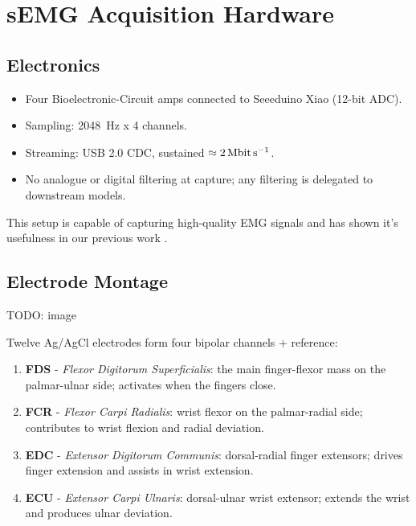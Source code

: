 \section{sEMG Acquisition Hardware}

\subsection{Electronics}
\begin{itemize}
  \item Four Bioelectronic-Circuit amps connected to Seeeduino Xiao (12-bit ADC).
  \item Sampling: \SI{2048}{Hz} x 4 channels.
  \item Streaming: USB 2.0 CDC, sustained $\approx \SI{2}{\mega\bit\per\second}$.
  \item No analogue or digital filtering at capture; any filtering is delegated
        to downstream models.
\end{itemize}

This setup is capable of capturing high-quality EMG signals and has shown it's usefulness in our previous work \cite{nasybullin2024methodology}.

\subsection{Electrode Montage}
TODO: image

Twelve Ag/AgCl electrodes form four bipolar channels + reference:

\begin{enumerate}[label=\alph*]
  \item \textbf{FDS} - \emph{Flexor Digitorum Superficialis}: the main finger-flexor mass on the palmar-ulnar side; activates when the fingers close.
  \item \textbf{FCR} - \emph{Flexor Carpi Radialis}: wrist flexor on the palmar-radial side; contributes to wrist flexion and radial deviation.
  \item \textbf{EDC} - \emph{Extensor Digitorum Communis}: dorsal-radial finger extensors; drives finger extension and assists in wrist extension.
  \item \textbf{ECU} - \emph{Extensor Carpi Ulnaris}: dorsal-ulnar wrist extensor; extends the wrist and produces ulnar deviation.
\end{enumerate}

